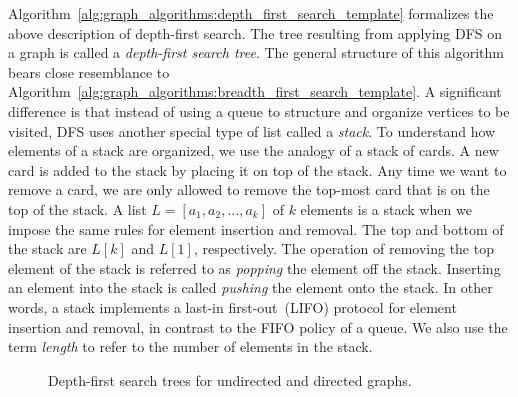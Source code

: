 Algorithm~\ref{alg:graph_algorithms:depth_first_search_template}
formalizes the above description of depth-first
search. The tree resulting from applying
DFS on a graph is called a
\emph{depth-first search tree}. The
general structure of this algorithm bears close resemblance to
Algorithm~\ref{alg:graph_algorithms:breadth_first_search_template}. A
significant difference is that instead of using a queue
to structure and organize vertices to be visited, DFS uses
another special type of list called a
\emph{stack}. To understand how elements of a stack are
organized, we use the analogy of a stack of cards. A new
card is added to the stack by placing it on top of the stack. Any time
we want to remove a card, we are only allowed to remove the top-most
card that is on the top of the stack. A list
$L = [a_1, a_2, \dots, a_k]$ of $k$ elements is a stack when we impose
the same rules for element insertion and removal. The top and bottom
of the stack are $L[k]$ and $L[1]$, respectively. The operation of
removing the top element of the stack is referred to as
\emph{popping} the element off the stack. Inserting
an element into the stack is called \emph{pushing}
the element onto the stack. In other words, a stack implements a
last-in first-out~(LIFO)
protocol for element insertion and removal, in contrast to the
FIFO policy of a queue. We also use the term
\emph{length} to refer to the number of elements
in the stack.

\begin{figure}[!htbp]
\centering
{}

\caption{Depth-first search trees for undirected and directed graphs.}
\label{fig:graph_algorithms:depth_first_search_undirected}
\end{figure}

